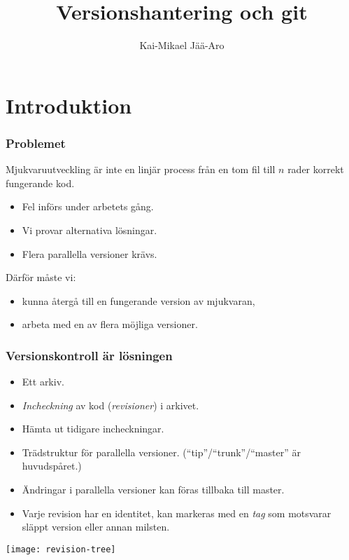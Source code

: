 \documentclass[swedish]{beamer}
\title{Versionshantering och git}
\author{Kai-Mikael Jää-Aro}
\date{}
\begin{document}
\setlength{\intextsep}{0mm}

\begin{frame}
\titlepage
\end{frame}

\section{Introduktion}
\begin{frame}
  \frametitle{Problemet}
Mjukvaruutveckling är inte en linjär process från en tom fil till \(n\) rader korrekt fungerande kod.
\begin{itemize}
\item Fel införs under arbetets gång.
\item Vi provar alternativa lösningar.
\item Flera parallella versioner krävs.
\end{itemize}

Därför måste vi:
\begin{itemize}
\item kunna återgå till en fungerande version av mjukvaran,
\item arbeta med en av flera möjliga versioner.
\end{itemize}

\end{frame}

\begin{frame}
\frametitle{Versionskontroll är lösningen} 
  \begin{itemize}
  \item Ett arkiv.
  \item\emph{Incheckning} av kod (\emph{revisioner}) i arkivet.
  \item Hämta ut tidigare incheckningar.
  \item  Trädstruktur för parallella
    versioner. (``tip''/``trunk''/``master'' är huvudspåret.)
  \item Ändringar i parallella versioner kan föras tillbaka till master.
  \item Varje revision har en identitet, kan markeras med en \emph{tag} som 
motsvarar släppt version eller annan milsten. 
  \end{itemize}
\end{frame}

\begin{frame}
\texttt{[image: revision-tree]}
\end{frame}
\end{document}
